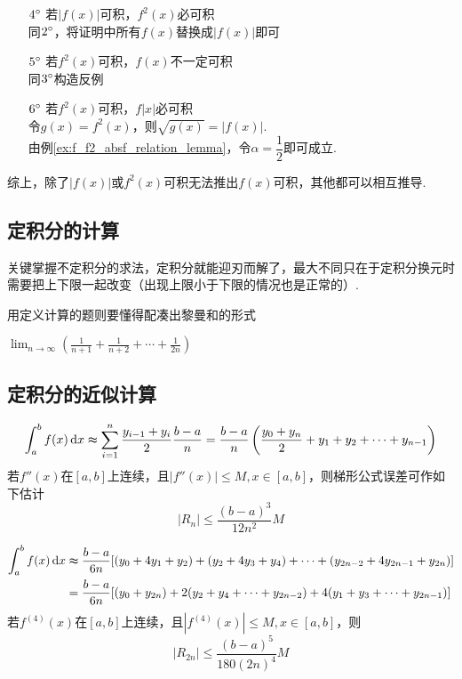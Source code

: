 \begin{analysis}
\begin{enumerate}
	\item[$4\degree$] 若$|f(x)|$可积，$f^2(x)$必可积\\
同$2\degree$，将证明中所有$f(x)$替换成$|f(x)|$即可
	\item[$5\degree$] 若$f^2(x)$可积，$f(x)$不一定可积\\
同$3\degree$构造反例
	\item[$6\degree$] 若$f^2(x)$可积，$f|x|$必可积\\
令$g(x)=f^2(x)$，则$\sqrt{g(x)}=|f(x)|$.\\
由例\ref{ex:f_f2_absf_relation_lemma}，令$\alpha=\dfrac{1}{2}$即可成立.
\end{enumerate}
\par 综上，除了$|f(x)|$或$f^2(x)$可积无法推出$f(x)$可积，其他都可以相互推导.
\end{analysis}

\subsection{定积分的计算}
关键掌握不定积分的求法，定积分就能迎刃而解了，最大不同只在于定积分换元时需要把上下限一起改变（出现上限小于下限的情况也是正常的）.
\par 用定义计算的题则要懂得配凑出黎曼和的形式
\begin{exercise}
\label{limitrimsum}
$\displaystyle\lim_{n\to\infty}\left(\frac{1}{n+1}+\frac{1}{n+2}+\cdots+\frac{1}{2n}\right)$
\end{exercise}

\subsection{定积分的近似计算}
\begin{definition}[定积分梯形公式]
\[\int_a^bf(x)\,\mathrm{d} x\thickapprox\sum_{i=1}^n\frac{y_{i-1}+y_i}{2}\frac{b-a}{n}=\frac{b-a}{n}\left(\frac{y_0+y_n}{2}+y_1+y_2+\cdots+y_{n-1}\right)\]
若$f''(x)$在$[a,b]$上连续，且$|f''(x)|\leq M,x\in[a,b]$，则梯形公式误差可作如下估计
\[|R_n|\leq\frac{(b-a)^3}{12n^2}M\]
\end{definition}
\begin{definition}
\[\begin{aligned}
\int_a^bf(x)\,\mathrm{d} x &\thickapprox\frac{b-a}{6n}[(y_0+4y_1+y_2)+(y_2+4y_3+y_4)+\cdots+(y_{2n-2}+4y_{2n-1}+y_{2n})]\\
&=\frac{b-a}{6n}[(y_0+y_{2n})+2(y_2+y_4+\cdots+y_{2n-2})+4(y_1+y_3+\cdots+y_{2n-1})]\end{aligned}\]
若$f^{(4)}(x)$在$[a,b]$上连续，且$|f^{(4)}(x)|\leq M,x\in[a,b]$，则
\[|R_{2n}|\leq\frac{(b-a)^5}{180(2n)^4}M\]
\end{definition}

